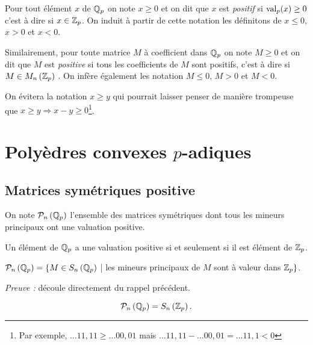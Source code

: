 \begin{notation}
	Pour tout élément $x$ de $ \mathbb{Q}_p$ on note $x\ge 0$ et on dit que $x$ est \textit{positif} si $\text{val}_p(x) \ge 0$ c'est à dire si $x \in  \mathbb {Z}_p $. On induit à partir de cette notation les définitons de $x\le 0$, $x>0$ et $x<0$.

	Similairement, pour toute matrice $M$ à coefficient dans $\mathbb{Q}_p$ on note $M\ge 0$ et on dit que $M$ est \textit{positive} si tous les coefficients de $M$  sont positifs, c'est à dire si $M \in M_n\left(  \mathbb {Z}_p  \right) $ . On infère également les notation $M\le 0$, $M>0$ et $M<0$.     
\end{notation}

\begin{remarque}
	On évitera la notation $x\ge y$ qui pourrait laisser penser de manière trompeuse que $x\ge y \Rightarrow x-y\ge 0$\footnote{Par exemple, $\ldots11,11 \ge \ldots00,01 $ mais $\ldots11,11 - \ldots00,01 = \ldots 11,1 < 0$}.
\end{remarque}
\section{Polyèdres convexes \texorpdfstring{$p$}{p}-adiques}
\subsection{Matrices symétriques positive} 

\begin{definition}
	On note $\mathcal{P}_n\left( \mathbb{Q}_p \right) $ l'ensemble des matrices symétriques dont tous les mineurs principaux ont une valuation positive.
\end{definition} 

\begin{rappel}
	
Un élément de $ \mathbb{Q}_p$ a une valuation positive si et seulement si il est élément de $ \mathbb {Z}_p $. 
\end{rappel}

\begin{propriete}
	
	$\mathcal{P}_n\left( \mathbb{Q}_p \right) = \{ M \in S_n\left( \mathbb{Q}_p \right)$ | les\- min\-eurs\- prin\-ci\-paux\- de\- $M$ \-sont \-à \-va\-leur \-dans\- $ \mathbb {Z}_p  \} $.
\end{propriete}

	\textit{Preuve :} découle directement du rappel précédent. 
	\medskip


\begin{prop}
	 \[
		 \mathcal{P}_n \left( \mathbb{Q}_p \right) = S_n\left(  \mathbb {Z}_p  \right) 
	.\]  
\end{prop}

